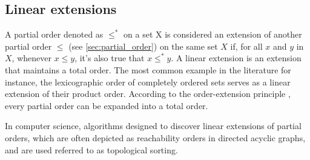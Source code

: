 \documentclass[10pt,journal,compsoc]{IEEEtran}
\begin{document}

\subsection{Linear extensions}
A partial order denoted as $\leq^*$ on a set X is considered an extension of
another partial order $\leq$ (see \ref{sec:partial_order}) on the same set $X$
if, for all $x$ and $y$ in $X$, whenever $x \leq y$, it's also true that $x
  \leq^* y$. A linear extension is an extension that maintains a total order. The
most common example in the literature for instance, the lexicographic order of
completely ordered sets serves as a linear extension of their product order.
According to the order-extension principle \cite{Jech1973}, every partial order
can be expanded into a total order.

In computer science, algorithms designed to discover linear extensions of
partial orders, which are often depicted as reachability orders in directed
acyclic graphs, and are used referred to as topological sorting.
\end{document}
